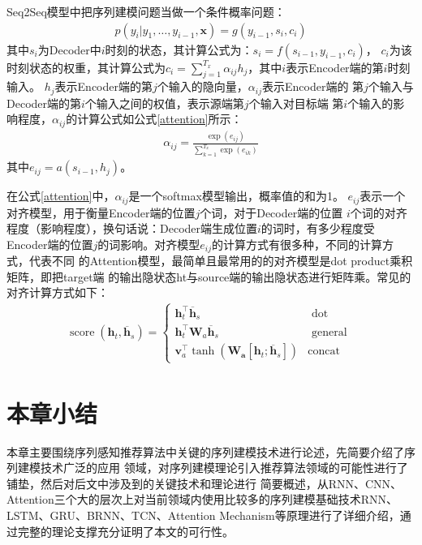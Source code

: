 Seq2Seq模型中把序列建模问题当做一个条件概率问题：
\begin{align}
  p\left(y_{i} | y_{1}, \ldots, y_{i-1}, \mathbf{x}\right)=g\left(y_{i-1}, s_{i}, c_{i}\right)
\end{align}
其中$s_{i}$为Decoder中$i$时刻的状态，其计算公式为：$s_{i}=f\left(s_{i-1}, y_{i-1}, c_{i}\right)$，
$c_{i}$为该时刻状态的权重，其计算公式为$c_{i}=\sum_{j=1}^{T_{x}} \alpha_{ij} h_{j}$，其中$i$表示Encoder端的第$i$时刻输入。
$h_{j}$表示Encoder端的第$j$个输入的隐向量，$\alpha_{i j}$表示Encoder端的%
第$j$个输入与Decoder端的第$i$个输入之间的权值，表示源端第$j$个输入对目标端%
第$i$个输入的影响程度，$\alpha_{i j}$的计算公式如公式\eqref{attention}所示：
\begin{align}
  \alpha_{i j}=\frac{\exp \left(e_{i j}\right)}{\sum_{k=1}^{T_{x}} \exp \left(e_{i k}\right)} \label{attention}
\end{align} 
其中$e_{i j}=a\left(s_{i-1}, h_{j}\right)$。

在公式\eqref{attention}中，$\alpha_{ij}$是一个softmax模型输出，概率值的和为1。%
$e_{ij}$表示一个对齐模型，用于衡量Encoder端的位置$j$个词，对于Decoder端的位置%
$i$个词的对齐程度（影响程度），换句话说：Decoder端生成位置$i$的词时，有多少程度受%
Encoder端的位置$j$的词影响。对齐模型$e_{ij}$的计算方式有很多种，不同的计算方式，代表不同%
的Attention模型，最简单且最常用的的对齐模型是dot product乘积矩阵，即把target端%
的输出隐状态ht与source端的输出隐状态进行矩阵乘。常见的对齐计算方式如下：
\begin{align}
\operatorname{score}\left(\boldsymbol{h}_{t}, \overline{\boldsymbol{h}}_{s}\right)=
\left\{
  \begin{array}{ll}{\boldsymbol{h}_{t}^{\top} \overline{\boldsymbol{h}}_{s}} & {\text { dot }} \\ {\boldsymbol{h}_{t}^{\top} \boldsymbol{W}_{a} \overline{\boldsymbol{h}}_{s}} & {\text { general }} \\ {\boldsymbol{v}_{a}^{\top} \tanh \left(\boldsymbol{W}_{\boldsymbol{a}}\left[\boldsymbol{h}_{t} ; \overline{\boldsymbol{h}}_{s}\right]\right)} & {\text {concat}}
  \end{array}
\right.
\end{align} 

\section{本章小结}

本章主要围绕序列感知推荐算法中关键的序列建模技术进行论述，先简要介绍了序列建模技术广泛的应用%
领域，对序列建模理论引入推荐算法领域的可能性进行了铺垫，然后对后文中涉及到的关键技术和理论进行%
简要概述，从RNN、CNN、Attention三个大的层次上对当前领域内使用比较多的序列建模基础技术RNN、LSTM、GRU、BRNN、TCN、Attention Mechanism等原理进行了详细介绍，通过完整的理论支撑充分证明了本文的可行性。
